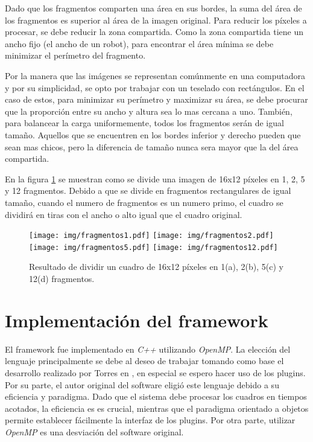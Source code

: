 Dado que los fragmentos comparten una área en sus bordes, la suma del área de
los fragmentos es superior al área de la imagen original. Para reducir los
píxeles a procesar, se debe reducir la zona compartida. Como la zona compartida
tiene un ancho fijo (el ancho de un robot), para encontrar el área mínima se
debe minimizar el perímetro del fragmento.

Por la manera que las imágenes se representan comúnmente en una computadora y
por su simplicidad, se opto por trabajar con un teselado con rectángulos. En el
caso de estos, para minimizar su perímetro y maximizar su área, se debe procurar
que la proporción entre su ancho y altura sea lo mas cercana a uno. También,
para balancear la carga uniformemente, todos los fragmentos serán de igual
tamaño. Aquellos que se encuentren en los bordes inferior y derecho pueden que
sean mas chicos, pero la diferencia de tamaño nunca sera mayor que la del área
compartida.

En la figura \ref{fragmentos} se muestran como se divide una imagen de 16x12
píxeles en 1, 2, 5 y 12 fragmentos. Debido a que se divide en fragmentos
rectangulares de igual tamaño, cuando el numero de fragmentos es un numero
primo, el cuadro se dividirá en tiras con el ancho o alto igual que el cuadro
original.

\begin{figure}[!h]

	\texttt{[image: img/fragmentos1.pdf]}
	\texttt{[image: img/fragmentos2.pdf]}
	\texttt{[image: img/fragmentos5.pdf]}
	\texttt{[image: img/fragmentos12.pdf]}
	\caption{Resultado de dividir un cuadro de 16x12 píxeles en 1(a), 2(b),
	5(c) y 12(d) fragmentos.}
	\label{fragmentos}

\end{figure}

\section{Implementación del framework}

El framework fue implementado en \emph{C++} utilizando \emph{OpenMP}. La
elección del lenguaje principalmente se debe al deseo de trabajar tomando como
base el desarrollo realizado por Torres en \cite{torres2014}, en especial se
espero hacer uso de los plugins. Por su parte, el autor original del software
eligió este lenguaje debido a su eficiencia y paradigma. Dado que el sistema
debe procesar los cuadros en tiempos acotados, la eficiencia es es crucial,
mientras que el paradigma orientado a objetos permite establecer fácilmente la
interfaz de los plugins. Por otra parte, utilizar \emph{OpenMP} es una
desviación del software original.

